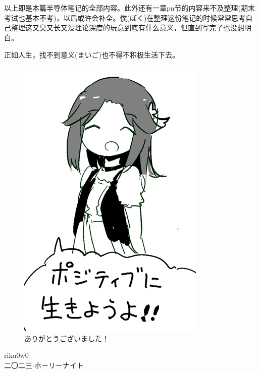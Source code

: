 \chapter*{ }

以上即是本篇半导体笔记的全部内容。此外还有一章pn节的内容来不及整理(期末考试也基本不考)，以后或许会补全。僕({\mincho ぼく})在整理这份笔记的时候常常思考自己整理这又臭又长又没理论深度的玩意到底有什么意义，但直到写完了也没想明白。

正如人生，找不到意义({\mincho まいご})也不得不积极生活下去。

\begin{figure}
    \centering
    \includegraphics[width=0.7\linewidth]{teru2.png}
    \caption*{\mincho ありがとうございました！}
    \label{fig:teru2}
\end{figure}

\begin{flushright}
	riku0w0 \\
	\mincho 二〇二三$\cdot$ホーリーナイト\\
\end{flushright}



